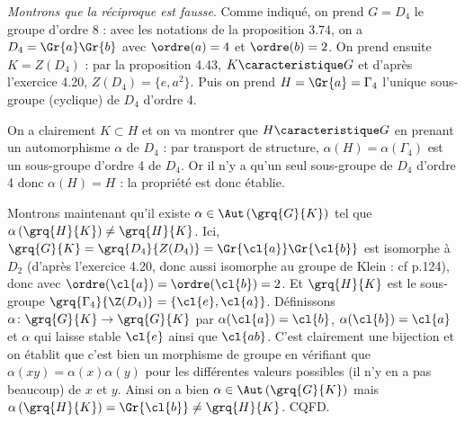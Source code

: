 \begin{enumerate}
    \emph{Montrons que la réciproque est fausse}. Comme indiqué, on prend $G=D_4$ le groupe d'ordre 8 : avec les notations de la proposition 3.74, on a  $D_4 = \Gr{a}\Gr{b}$ avec $\ordre(a)=4$ et $\ordre(b)=2$.
    On prend ensuite $K=Z(D_4)$ : par la proposition 4.43, $K \caracteristique G$ et d'après l'exercice 4.20, $Z(D_4)=\{e, a^2\}$. Puis on prend $H = \Gr{a} = \Gamma_4$ l'unique sous-groupe (cyclique) de $D_4$ d'ordre 4. 

    On a clairement $K\subset H$ et on va montrer que $H \caracteristique G$ en prenant un automorphisme $\alpha$ de $D_4$ : par transport de structure, $\alpha(H) = \alpha(\Gamma_4)$ est un sous-groupe 
    d'ordre 4 de $D_4$. Or il n'y a qu'un seul sous-groupe de $D_4$ d'ordre 4 donc $\alpha(H) = H$ : la propriété est donc établie.

    Montrons maintenant qu'il existe $\alpha \in \Aut\left(\grq{G}{K}\right)$  tel que $\alpha\left( \grq{H}{K}\right) \neq \grq{H}{K}$. Ici, $\grq{G}{K} = \grq{D_4}{Z(D_4)} = \Gr{\cl{a}} \Gr{\cl{b}}$ est isomorphe à $D_2$ (d'après l'exercice 4.20, donc aussi isomorphe au groupe de Klein : cf p.124), 
    donc avec $\ordre({\cl{a}})= \ordre({\cl{b}}) = 2$. Et $\grq{H}{K}$ est le sous-groupe $\grq{\Gamma_4}{\Z(D_4)} = \{\cl{e}, \cl{a}\}$. Définissons $\alpha\colon \grq{G}{K}\to \grq{G}{K}$ par $\alpha(\cl{a}) = \cl{b}$, 
    $\alpha(\cl{b}) = \cl{a}$ et $\alpha$ qui laisse stable $\cl{e}$ ainsi que $\cl{ab}$. C'est clairement une bijection et on établit que c'est bien un morphisme de groupe en vérifiant que $\alpha(xy) = \alpha(x)\alpha(y)$ pour les 
    différentes valeurs possibles (il n'y en a pas beaucoup) de $x$ et $y$. Ainsi on a bien $\alpha \in \Aut\left(\grq{G}{K}\right)$ mais $\alpha\left( \grq{H}{K}\right) =  \Gr{\cl{b}} \neq  \grq{H}{K}$. CQFD.

\end{enumerate}
